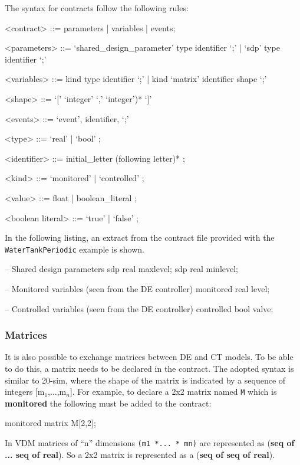 \documentclass{crescendorepchap}
\newcommand{\vdmkeyw}[1]{{\bf\ttfamily #1}}
\begin{document}
The syntax for contracts follow the following rules:

\begin{grammar}
<contract> ::= parameters | variables | events;

<parameters> ::= `shared\_design\_parameter' type identifier `;'
             |   `sdp' type identifier `;'

<variables> ::= kind type identifier `;' 
            |   kind `matrix' identifier shape `;'

<shape> ::= `[' `integer' `,' `integer')* `]' 

<events> ::= `event', identifier, `;'

<type> ::= `real' | `bool' ;

<identifier> ::= initial\_letter (following letter)* ;

<kind> ::= `monitored' | `controlled' ;

<value> ::= float | boolean\_literal ;

<boolean literal> ::= `true' | `false' ;
\end{grammar}

In the following listing, an extract from the contract file provided
with the \texttt{Water\-Tank\-Periodic} example is shown.

\begin{dcl}
-- Shared design parameters
sdp real maxlevel;
sdp real minlevel; 

-- Monitored variables (seen from the DE controller)
monitored real level;

-- Controlled variables (seen from the DE controller)
controlled bool valve; 
\end{dcl}

\subsubsection{Matrices}

It is also possible to exchange matrices
between DE and CT models. To be able to do this, a matrix needs to be
declared in the contract. The adopted syntax is similar to 20-sim, where
the shape of the matrix is indicated by a sequence of integers
{[}m$_1$,...,m$_n${]}. For example, to declare
a 2x2 matrix named \texttt{M} which is \vdmkeyw{monitored} the following must be
added to the contract:

\begin{dcl}
monitored matrix M[2,2];
\end{dcl}

In VDM matrices of ``n'' dimensions
\texttt{(m1 *... * mn)} are
represented as (\vdmkeyw{seq of ... seq of real}). So a 2x2 matrix is
represented as a (\vdmkeyw{seq of seq of
real}).
\end{document}
